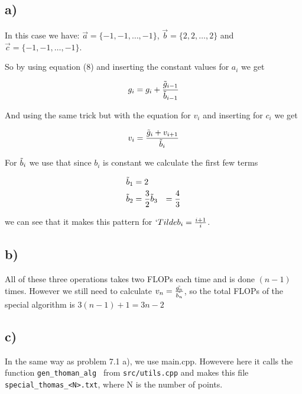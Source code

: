 \documentclass[a4paper,10pt,english]{article}
\begin{document}
\section{} %

\subsection{a)}

In this case we have: $\vec{a}=\{-1, -1, \dots, -1\}$, $\vec{b}=\{2,2, \dots, 2\}$
and $\vec{c} = \{-1, -1, \dots, -1\}$.

So by using equation (8) and inserting the constant values for $a_i$ we get

\begin{align*}
	g_i = g_i + \frac{\Tilde{g}_{i - 1}}{\Tilde{b}_{i - 1}}
\end{align*}

And using the same trick but with the equation for $v_i$ and inserting for $c_i$ we get

\begin{align*}
	v_i = \frac{\Tilde{g}_i + v_{i + 1}}{\Tilde{b}_i}
\end{align*}

For $\Tilde{b}_i$ we use that since $b_i$ is constant we calculate the first few terms

\begin{align*}
	\Tilde{b}_1 &= 2 \\
	\Tilde{b}_2 &= \frac{3}{2}
	\Tilde{b}_3 &= \frac{4}{3}
\end{align*}

we can see that it makes this pattern for $`Tilde{b}_i = \frac{i + 1}{i}$. \\

\subsection{b)}

All of these three operations takes two FLOPs each time and is done $(n - 1)$ times. However
we still need to calculate $v_n = \frac{\Tilde{g_n}}{\Tilde{b_n}}$, so the total FLOPs of the special algorithm is 
$3 (n - 1) + 1 = 3n - 2$


\subsection{c)}

In the same way as problem 7.1 a), we use main.cpp. Howevere here it calls the function \verb|gen_thoman_alg | from \verb|src/utils.cpp| and makes this file \verb|special_thomas_<N>.txt|, where N is the number of points.
\end{document}
